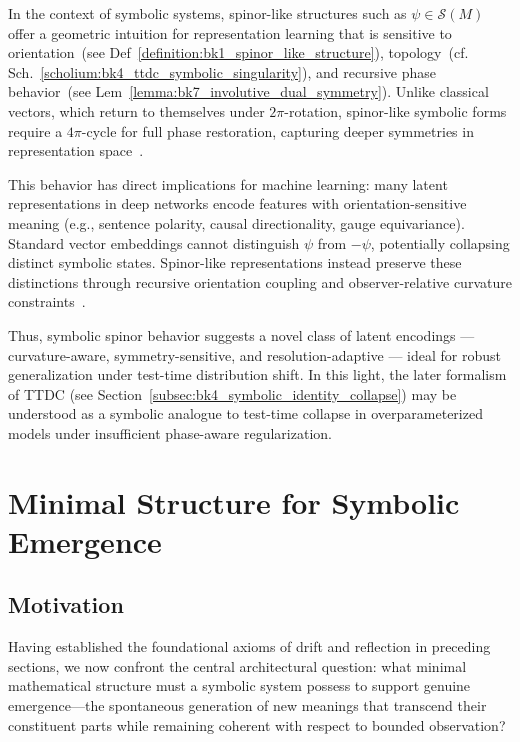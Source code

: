 \begin{scholium}
\label{scholium:bk1_spinor_like_ml}
In the context of symbolic systems, spinor-like structures such as \( \psi \in \mathcal{S}(M) \) offer a geometric intuition for representation learning that is sensitive to orientation~(see Def~\ref{definition:bk1_spinor_like_structure}), topology~(cf. Sch.~\ref{scholium:bk4_ttdc_symbolic_singularity}), and recursive phase behavior~(see Lem~\ref{lemma:bk7_involutive_dual_symmetry}). Unlike classical vectors, which return to themselves under \( 2\pi \)-rotation, spinor-like symbolic forms require a \( 4\pi \)-cycle for full phase restoration, capturing deeper symmetries in representation space~\cite{lawson_spin_geometry,penrose_spinors}.

This behavior has direct implications for machine learning: many latent representations in deep networks encode features with orientation-sensitive meaning (e.g., sentence polarity, causal directionality, gauge equivariance). Standard vector embeddings cannot distinguish $\psi$ from $-\psi$, potentially collapsing distinct symbolic states. Spinor-like representations instead preserve these distinctions through recursive orientation coupling and observer-relative curvature constraints~\cite{friedrich_dirac,nash_sen}.

Thus, symbolic spinor behavior suggests a novel class of latent encodings — curvature-aware, symmetry-sensitive, and resolution-adaptive — ideal for robust generalization under test-time distribution shift. In this light, the later formalism of TTDC (see Section~\ref{subsec:bk4_symbolic_identity_collapse}) may be understood as a symbolic analogue to test-time collapse in overparameterized models under insufficient phase-aware regularization.
\end{scholium}

\section{Minimal Structure for Symbolic Emergence}
\label{sec:bk1_minimal_structure_for_symbolic_emergence}
\subsection{Motivation}
\label{subsec:bk1_motivation}

Having established the foundational axioms of drift and reflection in preceding sections, we now confront the central architectural question: what minimal mathematical structure must a symbolic system possess to support genuine emergence—the spontaneous generation of new meanings that transcend their constituent parts while remaining coherent with respect to bounded observation?

